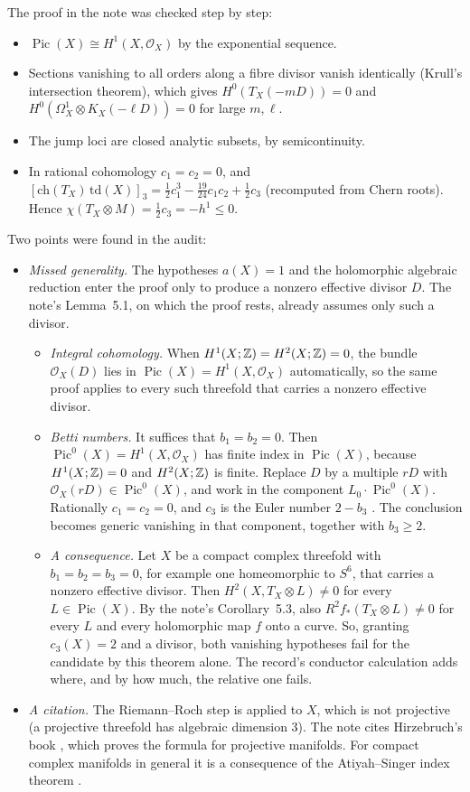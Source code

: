 The proof in the note was checked step by step:
\begin{itemize}
\item $\operatorname{Pic}(X)\cong H^1(X,\mathcal O_X)$ by the exponential sequence.
\item Sections vanishing to all orders along a fibre divisor vanish identically (Krull's intersection theorem), which gives $H^0(T_X(-mD))=0$ and $H^0(\Omega^1_X\otimes K_X(-\ell D))=0$ for large $m,\ell$.
\item The jump loci are closed analytic subsets, by semicontinuity.
\item In rational cohomology $c_1=c_2=0$, and $[\mathrm{ch}(T_X)\,\mathrm{td}(X)]_3=\tfrac12c_1^3-\tfrac{19}{24}c_1c_2+\tfrac12c_3$ (recomputed from Chern roots). Hence $\chi(T_X\otimes M)=\tfrac12c_3=-h^1\le0$.
\end{itemize}
Two points were found in the audit:
\begin{itemize}
\item \emph{Missed generality.} The hypotheses $a(X)=1$ and the holomorphic algebraic reduction enter the proof only to produce a nonzero effective divisor $D$. The note's Lemma~5.1, on which the proof rests, already assumes only such a divisor.
\begin{itemize}
\item \emph{Integral cohomology.} When $H^1(X;\mathbb{Z})=H^2(X;\mathbb{Z})=0$, the bundle $\mathcal O_X(D)$ lies in $\operatorname{Pic}(X)=H^1(X,\mathcal O_X)$ automatically, so the same proof applies to every such threefold that carries a nonzero effective divisor.
\item \emph{Betti numbers.} It suffices that $b_1=b_2=0$. Then $\operatorname{Pic}^0(X)=H^1(X,\mathcal O_X)$ has finite index in $\operatorname{Pic}(X)$, because $H^1(X;\mathbb{Z})=0$ and $H^2(X;\mathbb{Z})$ is finite. Replace $D$ by a multiple $rD$ with $\mathcal O_X(rD)\in\operatorname{Pic}^0(X)$, and work in the component $L_0\cdot\operatorname{Pic}^0(X)$. Rationally $c_1=c_2=0$, and $c_3$ is the Euler number $2-b_3$ \cite[Cor.~11.12 and §14]{MS74}. The conclusion becomes generic vanishing in that component, together with $b_3\ge2$.
\item \emph{A consequence.} Let $X$ be a compact complex threefold with $b_1=b_2=b_3=0$, for example one homeomorphic to $S^6$, that carries a nonzero effective divisor. Then $H^2(X,T_X\otimes L)\neq0$ for every $L\in\operatorname{Pic}(X)$. By the note's Corollary~5.3, also $R^2f_*(T_X\otimes L)\neq0$ for every $L$ and every holomorphic map $f$ onto a curve. So, granting $c_3(X)=2$ and a divisor, both vanishing hypotheses fail for the candidate by this theorem alone. The record's conductor calculation adds where, and by how much, the relative one fails.
\end{itemize}
\item \emph{A citation.} The Riemann--Roch step is applied to $X$, which is not projective (a projective threefold has algebraic dimension $3$). The note cites Hirzebruch's book \cite{Hir66}, which proves the formula for projective manifolds. For compact complex manifolds in general it is a consequence of the Atiyah--Singer index theorem \cite{AS68}.
\end{itemize}
